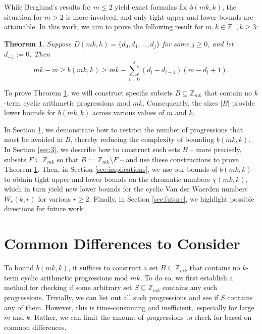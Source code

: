\documentclass{article}
\newtheorem{theorem}{Theorem}[section]
\theoremstyle{definition}
\theoremstyle{remark}
\begin{document}
While Berglund's results for $m \leq 2$ yield exact formulas for $b(mk,k)$, the situation for $m > 2$ is more involved, and only tight upper and lower bounds are attainable. In this work, we aim to prove the following result for $m,k \in \mathbb{Z}^+, k \geq 3$:

\begin{theorem}
\label{maintheorem}
    Suppose $D(mk,k) = \{d_0,d_1,\ldots,d_{j}\}$ for some $j \geq 0$, and let $d_{-1} := 0$. Then \begin{equation*}
        mk-m \geq b(mk,k) \geq mk-\sum_{i=0}^{j}(d_i-d_{i-1})(m-d_i+1).
    \end{equation*}
\end{theorem}

To prove Theorem \ref{maintheorem}, we will construct specific subsets $B \subseteq \mathbb{Z}_{mk}$ that contain no $k$-term cyclic arithmetic progressions mod $mk$. Consequently, the sizes $|B|$ provide lower bounds for $b(mk,k)$ across various values of $m$ and $k$. 

In Section \ref{sec: lemmas}, we demonstrate how to restrict the number of progressions that must be avoided in $B$, thereby reducing the complexity of bounding $b(mk,k)$. In Section \ref{sec:3}, we describe how to construct such sets $B$ -- more precisely, subsets $F \subseteq\mathbb{Z}_{mk}$ so that $B := \mathbb{Z}_{mk} \setminus F$ -- and use these constructions to prove Theorem \ref{maintheorem}. Then, in Section \ref{sec:implications}, we use our bounds of $b(mk,k)$ to obtain tight upper and lower bounds on the chromatic numbers $\chi(mk,k)$, which in turn yield new lower bounds for the cyclic Van der Waerden numbers $W_{c}(k,r)$ for various $r \geq 2$. Finally, in Section \ref{sec:future}, we highlight possible directions for future work.

\section{Common Differences to Consider}
\label{sec: lemmas}

To bound $b(mk,k)$, it suffices to construct a set $B \subseteq \mathbb{Z}_{mk}$ that contains no $k$-term cyclic arithmetic progressions mod $mk$. To do so, we first establish a method for checking if some arbitrary set $S \subseteq \mathbb{Z}_{mk}$ contains any such progressions. 
Trivially, we can list out all such progressions and see if $S$ contains any of them. However, this is time-consuming and inefficient, especially for large $m$ and $k$. Rather, we can limit the amount of progressions to check for based on common differences. 
\end{document}

